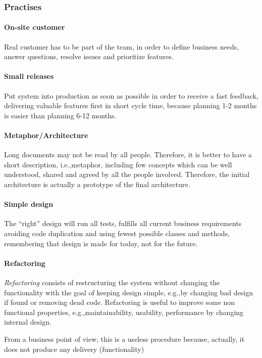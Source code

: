 \subsubsection{Practises}
\paragraph{On-site customer}
Real customer has to be part of the team, in order to define business needs, answer questions, resolve issues and prioritize features.

\paragraph{Small releases}
Put system into production as soon as possible in order to receive a fast feedback, delivering valuable features first in short cycle time, because planning 1-2 months is easier than planning 6-12 months.

\paragraph{Metaphor/Architecture}
Long documents may not be read by all people. Therefore, it is better to have a short description, i.e.,\@ metaphor, including few concepts which can be well understood, shared and agreed by all the people involved. Therefore, the initial architecture is actually a prototype of the final architecture.

\paragraph{Simple design}
The ``right'' design will run all tests, fulfills all current business requirements avoiding code duplication and using fewest possible classes and methods, remembering that design is made for today, not for the future.

\paragraph{Refactoring}
\emph{Refactoring} consists of restructuring the system without changing the functionality with the goal of keeping design simple, e.g.,\@ by changing bad design if found or removing dead code. Refactoring is useful to improve some non functional properties, e.g.,\@ maintainability, usability, performance by changing internal design.

From a business point of view, this is a useless procedure because, actually, it does not produce any delivery (functionality)

